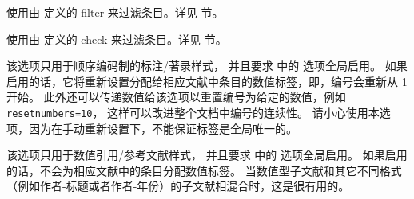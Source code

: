 \begin{optionlist*}

使用由  定义的 filter  来过滤条目。详见  节。



使用由  定义的 check  来过滤条目。详见   节。



该选项只用于顺序编码制的标注/著录样式，
并且要求  中的  选项全局启用。
如果启用的话，它将重新设置分配给相应文献中条目的数值标签，即，编号会重新从 1 开始。
此外还可以传递数值给该选项以重置编号为给定的数值，例如 \texttt{resetnumbers=10}，
这样可以改进整个文档中编号的连续性。
请小心使用本选项，因为在手动重新设置下，\biblatex 不能保证标签是全局唯一的。



该选项只用于数值引用/参考文献样式，
并且要求  中的  选项全局启用。
如果启用的话，\biblatex 不会为相应文献中的条目分配数值标签。
当数值型子文献和其它不同格式（例如作者-标题或者作者-年份）的子文献相混合时，这是很有用的。

\end{optionlist*}

